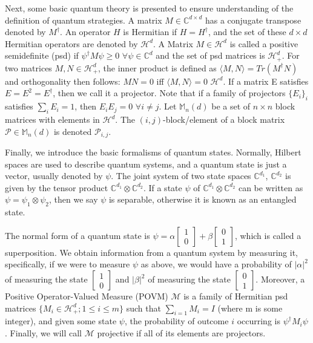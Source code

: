 \documentclass[12pt]{article}
\begin{document}
Next, some basic quantum theory is presented to ensure understanding of the definition of quantum strategies. A matrix $M \in \mathbb{C}^{d \times d}$ has a conjugate transpose denoted by $M^\dag$. An operator $H$ is Hermitian if $H = {H^{\dag}}$, and the set of these $d \times d$ Hermitian operators are denoted by $\mathcal{H}^d$. A Matrix $M \in \mathcal{H}^d$ is called a positive semidefinite (psd) if $\psi^\dag M \psi \geq 0$ $\forall \psi \in \mathbb{C}^d$ and the set of psd matrices is $\mathcal{H}^d_+$. For two matrices $M, N \in \mathcal{H}^d_+$, the inner product is defined as $\langle M, N\rangle = Tr(M^\dag N)$ and orthogonality then follows: $MN = 0$ iff $\langle M, N \rangle = 0$ $\mathcal{H}^d$. If a matrix E satisfies $E = E^2 = E^\dag$, then we call it a projector. Note that if a family of projectors $\{E_i\}_i$ satisfies $\sum_iE_i = 1$, then $E_iE_j = 0$ $\forall i \neq j$. Let $\mathbb{M}_n(d)$ be a set of $n \times n$ block matrices with elements in $\mathcal{H}^d$. The $(i, j)$-block/element of a block matrix $\mathcal{P} \in \mathbb{M}_n(d)$ is denoted $\mathcal{P}_{i, j}$.

Finally, we introduce the basic formalisms of quantum states. Normally, Hilbert spaces are used to describe quantum systems, and a quantum state is just a vector, usually denoted by $\psi$. The joint system of two state spaces $\mathbb{C}^{d_1}$, $\mathbb{C}^{d_2}$ is given by the tensor product $\mathbb{C}^{d_1} \otimes \mathbb{C}^{d_2}$. If a state $\psi$ of $\mathbb{C}^{d_1} \otimes \mathbb{C}^{d_2}$ can be written as $\psi = \psi_1 \otimes \psi_2$, then we say $\psi$ is separable, otherwise it is known as an entangled state.

The normal form of a quantum state is $\psi = \alpha \begin{bmatrix}
1 \\
0 
\end{bmatrix}
+ \beta
\begin{bmatrix}
0 \\
1
\end{bmatrix}
$, which is called a superposition. We obtain information from a quantum system by measuring it, specifically, if we were to measure $\psi$ as above, we would have a probability of $|\alpha|^2$ of measuring the state $\begin{bmatrix}
1 \\
0 
\end{bmatrix}$ and $|\beta|^2$ of measuring the state $\begin{bmatrix}
0 \\
1 
\end{bmatrix}$. Moreover, a Positive Operator-Valued Measure (POVM) $\mathcal{M}$ is a family of Hermitian psd matrices $\{ M_i \in \mathcal{H}^d_+; 1 \leq i \leq m \}$ such that $\sum_{i=1}M_i = I$ (where m is some integer), and given some state $\psi$, the probability of outcome $i$ occurring is $\psi^\dag M_i \psi$. Finally, we will call $\mathcal{M}$ projective if all of its elements are projectors.
\end{document}
